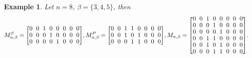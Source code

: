 \documentclass{article}
\newtheorem{example}{Example}[section]
\begin{document}
\begin{example}
   Let $n=8$, $\beta=\{3,4,5\}$, then 
   \[M_{n,\beta}^S=
   {
   \renewcommand{\arraystretch}{0.9} 
   \setlength{\arraycolsep}{3pt}
   \begin{bmatrix}
   0 & 0 & 1 & 0 & 0 & 0 & 0 & 0  \\
   0 & 0 & 0 & 1 & 0 & 0 & 0 & 0  \\
   0 & 0 & 0 & 0 & 1 & 0 & 0 & 0  \\
   \end{bmatrix} 
   }
   , M_{n,\beta}^P=
   {
   \renewcommand{\arraystretch}{0.9} 
   \setlength{\arraycolsep}{3pt}\begin{bmatrix}
   0 & 0 & 1 & 1 & 0 & 0 & 0 & 0 \\
   0 & 0 & 1 & 0 & 1 & 0 & 0 & 0 \\
   0 & 0 & 0 & 1 & 1 & 0 & 0 & 0 
   \end{bmatrix}
   }, M_{n,\beta}=
   {
   \renewcommand{\arraystretch}{0.9}
   \setlength{\arraycolsep}{3pt}
   \begin{bmatrix}
   0 & 0 & 1 & 0 & 0 & 0 & 0 & 0 \\
   0 & 0 & 0 & 1 & 0 & 0 & 0 & 0 \\
   0 & 0 & 0 & 0 & 1 & 0 & 0 & 0 \\
   0 & 0 & 1 & 1 & 0 & 0 & 0 & 0 \\
   0 & 0 & 1 & 0 & 1 & 0 & 0 & 0 \\
   0 & 0 & 0 & 1 & 1 & 0 & 0 & 0 
   \end{bmatrix}
   }.
   \]
\end{example}
\end{document}
